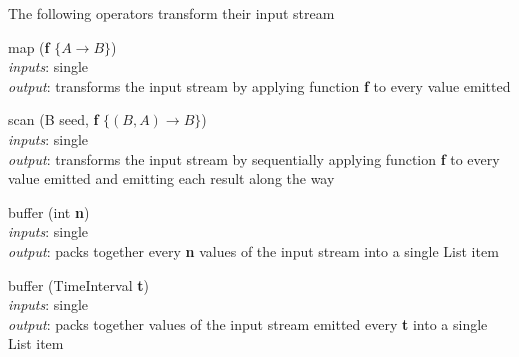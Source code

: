 \documentclass{dithesis}
\begin{document}
The following operators transform their input stream
\begin{description}

\begin{minipage}[c]{0.4\linewidth}
\item[map] (\textbf{f} $\{ A \to B \}$)\\
	\textit{inputs}: single \\
	\textit{output}: transforms the input stream by applying function \textbf{f} to every value emitted	
\end{minipage}
\begin{minipage}[c]{0.6\linewidth}

\end{minipage}

\begin{minipage}[c]{0.4\linewidth}
\item[scan] (B seed, \textbf{f} $\{ (B, A) \to B \}$)\\
	\textit{inputs}: single \\
	\textit{output}: transforms the input stream by sequentially applying function \textbf{f} to every value emitted  and emitting each result along the way
\end{minipage}
\begin{minipage}[c]{0.6\linewidth}

\end{minipage}

\begin{minipage}[c]{0.4\linewidth}
\item[buffer] (int \textbf{n})\\
	\textit{inputs}: single \\
	\textit{output}: packs together every \textbf{n} values of the input stream into a single List item
\end{minipage}
\begin{minipage}[c]{0.6\linewidth}

\end{minipage}

\begin{minipage}[c]{0.4\linewidth}
\item[buffer] (TimeInterval \textbf{t})\\
	\textit{inputs}: single \\
	\textit{output}: packs together values of the input stream emitted every \textbf{t} into a single List item
\end{minipage}
\begin{minipage}[c]{0.6\linewidth}

\end{minipage}

\end{description}
\end{document}
